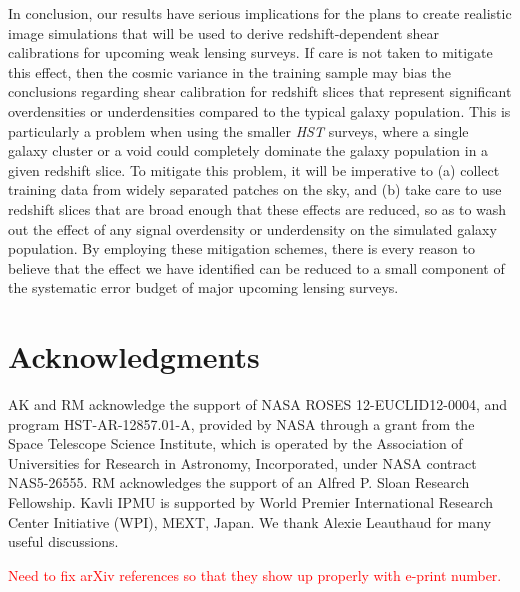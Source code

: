\documentclass[twocolumn,useAMS,usenatbib]{mn2e}
\newcommand{\rachel}[1]{{\textcolor{red}{#1}}}
\begin{document}
In conclusion, our results have serious implications for the plans to
create realistic image simulations that will be used to derive
redshift-dependent shear calibrations for upcoming weak lensing
surveys.  If care is not taken to mitigate this effect, then the
cosmic variance in the training sample may bias the conclusions
regarding shear calibration for redshift slices that represent
significant overdensities or underdensities compared to the typical
galaxy population.  This is particularly a problem when using the
smaller {\em HST} surveys, where a single galaxy cluster or a void
could completely dominate the galaxy population in a given redshift
slice.  To mitigate this problem, it will be imperative to (a) collect
training data from widely separated patches on the sky, and (b) take
care to use redshift slices that are broad enough that these effects
are reduced, so as to wash out the effect of any signal overdensity or
underdensity on the simulated galaxy population.  By employing these
mitigation schemes, there is every reason to believe that the effect
we have identified can be reduced to a small component of the
systematic error budget of major upcoming lensing surveys.


\section*{Acknowledgments}

AK and RM acknowledge the support of NASA ROSES 12-EUCLID12-0004, and
program HST-AR-12857.01-A, provided by NASA through a grant from the
Space Telescope Science Institute, which is operated by the
Association of Universities for Research in Astronomy, Incorporated,
under NASA contract NAS5-26555. RM acknowledges the support of an Alfred P. Sloan Research Fellowship. 
Kavli IPMU is supported by World Premier International Research Center Initiative (WPI), MEXT, Japan.
We thank Alexie Leauthaud for 
many useful discussions.

\rachel{Need to fix arXiv references so that they show up properly
  with e-print number.}


\end{document}
